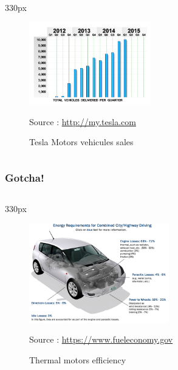 \begin{frame}
\begin{center}
\begin{columns}
\begin{column}{330px}
{
    \begin{figure}[h!]
        \centering
        \includegraphics[width=200px]
            {images/tesla-vehicules-sales.jpg}
        \caption{Tesla Motors vehicules sales}
        \scriptsize{Source :
            \url{http://my.tesla.com}}
    \end{figure}
}
\end{column}
\end{columns}
\end{center}
\end{frame}


\begin{frame}
\end{frame}


\begin{frame}
\end{frame}


\begin{frame}
\frametitle{Gotcha!}
\begin{center}
\begin{columns}
\begin{column}{330px}
{
    \begin{figure}[h!]
        \centering
        \includegraphics[width=230px]
            {images/efficiency-thermal-motors.jpg}
        \vspace{-0.5em}
        \caption{Thermal motors efficiency}
        \vspace{-0.3em}
        \scriptsize{Source :
            \url{https://www.fueleconomy.gov}}
    \end{figure}
}
\end{column}
\end{columns}
\end{center}
\end{frame}



